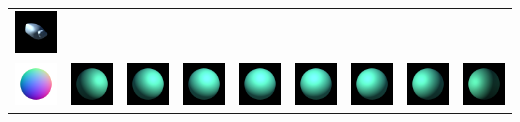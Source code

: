 \begin{center}
\begin{longtable}{@{}c@{}c@{}c@{}c@{}c@{}c@{}c@{}c@{}c@{}}
\includegraphics[width=0.1\linewidth]{training/24_7.png} \\
\includegraphics[width=0.1\linewidth]{training/25_gt.png} & \includegraphics[width=0.1\linewidth]{training/25_0.png} &
\includegraphics[width=0.1\linewidth]{training/25_1.png} & \includegraphics[width=0.1\linewidth]{training/25_2.png} &
\includegraphics[width=0.1\linewidth]{training/25_3.png} & \includegraphics[width=0.1\linewidth]{training/25_4.png} &
\includegraphics[width=0.1\linewidth]{training/25_5.png} & \includegraphics[width=0.1\linewidth]{training/25_6.png} &
\includegraphics[width=0.1\linewidth]{training/25_7.png} \\

\end{longtable}
\end{center}
